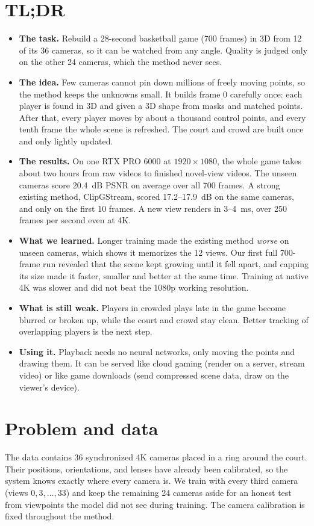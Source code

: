 \documentclass[11pt]{article}
\begin{document}
\section*{TL;DR}
\begin{itemize}
\item \textbf{The task.} Rebuild a 28-second basketball game (700 frames) in 3D from 12 of its 36
cameras, so it can be watched from any angle. Quality is judged only on the other 24 cameras, which
the method never sees.
\item \textbf{The idea.} Few cameras cannot pin down millions of freely moving points, so the method
keeps the unknowns small. It builds frame 0 carefully once: each player is found in 3D and given a
3D shape from masks and matched points. After that, every player moves by about a thousand control
points, and every tenth frame the whole scene is refreshed. The court and crowd are built once and
only lightly updated.
\item \textbf{The results.} On one RTX PRO 6000 at $1920\times1080$, the whole game takes about two
hours from raw videos to finished novel-view videos. The unseen cameras score 20.4~dB PSNR on average
over all 700 frames. A strong existing method, ClipGStream, scored 17.2--17.9~dB on the same cameras,
and only on the first 10 frames. A new view renders in 3--4~ms, over 250 frames per second even at 4K.
\item \textbf{What we learned.} Longer training made the existing method \emph{worse} on unseen
cameras, which shows it memorizes the 12 views. Our first full 700-frame run revealed that the scene
kept growing until it fell apart, and capping its size made it faster, smaller and better at the same
time. Training at native 4K was slower and did not beat the 1080p working resolution.
\item \textbf{What is still weak.} Players in crowded plays late in the game become blurred or broken
up, while the court and crowd stay clean. Better tracking of overlapping players is the next step.
\item \textbf{Using it.} Playback needs no neural networks, only moving the points and drawing them.
It can be served like cloud gaming (render on a server, stream video) or like game downloads (send
compressed scene data, draw on the viewer's device).
\end{itemize}


\section{Problem and data}
The data contains 36 synchronized 4K cameras placed in a ring around the court. Their positions,
orientations, and lenses have already been calibrated, so the system knows exactly where every
camera is. We train with every third camera (views $0,3,\ldots,33$) and keep the remaining 24
cameras aside for an honest test from viewpoints the model did not see during training. The camera
calibration is fixed throughout the method.
\end{document}
